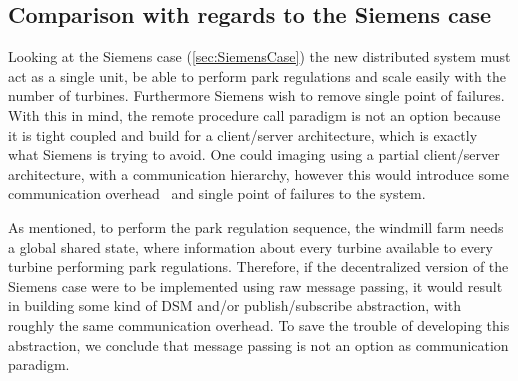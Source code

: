 %	

\subsection{Comparison with regards to the Siemens case}\label{distCompSiemensCaseComparison}

Looking at the Siemens case (\cref{sec:SiemensCase}) the new distributed system must act as a single unit, be able to perform park regulations and scale easily with the number of turbines. Furthermore Siemens wish to remove single point of failures. With this in mind, the remote procedure call paradigm is not an option because it is tight coupled and build for a client/server architecture, which is exactly what Siemens is trying to avoid. One could imaging using a partial client/server architecture, with a communication hierarchy, however this would introduce some communication overhead~\cite{Yu1997JavaDSM} and single point of failures to the system.

As mentioned, to perform the park regulation sequence, the windmill farm needs a global shared state, where information about every turbine available to every turbine performing park regulations. Therefore, if the decentralized version of the Siemens case were to be implemented using raw message passing, it would result in building some kind of DSM and/or publish/subscribe abstraction, with roughly the same communication overhead. To save the trouble of developing this abstraction, we conclude that message passing is not an option as communication paradigm.

